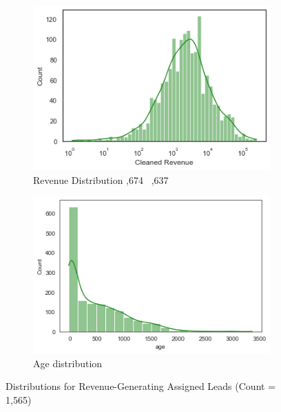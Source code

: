 \documentclass[11pt]{article}
\begin{document}
\begin{figure}[h!]
    \centering
    \begin{subfigure}[l]{0.45\textwidth}
         \centering
        \includegraphics[scale=.5]{Images/Assigned_Revenue_Histogram.png}
         \caption{Revenue Distribution ,674 \  ,637}
         \label{fig:revenue distribution}
     \end{subfigure}
       \begin{subfigure}[r]{0.4\textwidth}
         \centering
       \includegraphics[scale=.5]{Images/assigned_date_created_histogram.png}
         \caption{Age distribution  \ }
         \label{fig:date distriburtion}
     \end{subfigure}
    \caption{Distributions for Revenue-Generating Assigned Leads (Count = 1,565)}
    \label{fig:assigned_lead_rev}
\end{figure}
\end{document}
